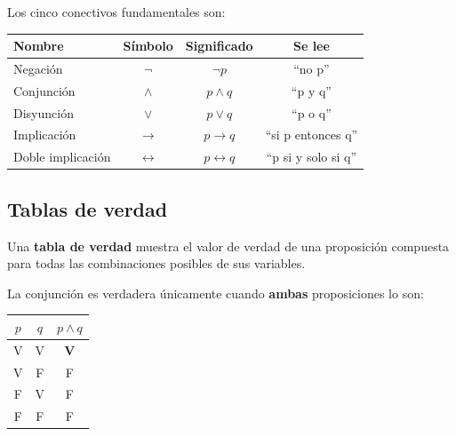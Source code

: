 \begin{definicion}
Los cinco conectivos fundamentales son:

\begin{center}
\begin{tabular}{lccc}
\toprule
\textbf{Nombre} & \textbf{Símbolo} & \textbf{Significado} & \textbf{Se lee} \\
\midrule
Negación    & $\lnot$ & $\lnot p$ & ``no p'' \\
Conjunción  & $\land$ & $p \land q$ & ``p y q'' \\
Disyunción  & $\lor$  & $p \lor q$  & ``p o q'' \\
Implicación & $\to$   & $p \to q$   & ``si p entonces q'' \\
Doble implicación & $\leftrightarrow$ & $p \leftrightarrow q$ & ``p si y solo si q'' \\
\bottomrule
\end{tabular}
\end{center}
\end{definicion}


\subsection{Tablas de verdad}

Una \textbf{tabla de verdad} muestra el valor de verdad de una proposición
compuesta para todas las combinaciones posibles de sus variables.

\begin{ejemplo}
La conjunción es verdadera únicamente cuando \textbf{ambas} proposiciones
lo son:

\begin{center}
\begin{tabular}{c|c|c}
$p$ & $q$ & $p \land q$ \\
\midrule
V & V & \textbf{V} \\
V & F & F \\
F & V & F \\
F & F & F
\end{tabular}
\end{center}
\end{ejemplo}

